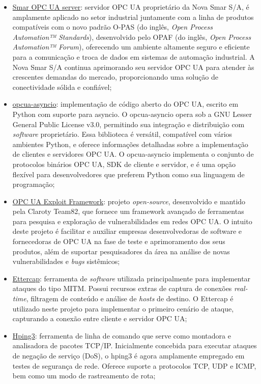     \begin{itemize}
        \item \underline{Smar OPC UA server}: servidor OPC UA proprietário da Nova Smar S/A, é amplamente aplicado no setor industrial juntamente com a linha de produtos compatíveis com o novo padrão O-PAS (do inglês, \textit{Open Process Automation™ Standards}), desenvolvido pelo OPAF (do inglês, \textit{Open Process Automation™ Forum}), oferecendo um ambiente altamente seguro e eficiente para a comunicação e troca de dados em sistemas de automação industrial. A Nova Smar S/A continua aprimorando seu servidor OPC UA para atender às crescentes demandas do mercado, proporcionando uma solução de conectividade sólida e confiável;
        \item \underline{opcua-asyncio}: implementação de código aberto do OPC UA, escrito em Python com suporte para asyncio. O opcua-asyncio opera sob a GNU Lesser General Public License v3.0,  permitindo sua integração e distribuição com \textit{software} proprietário. Essa biblioteca é versátil, compatível com vários ambientes Python, e oferece informações detalhadas sobre a implementação de clientes e servidores OPC UA. O opcua-asyncio implementa o conjunto de protocolos binários OPC UA, SDK de cliente e servidor, e é uma opção flexível para desenvolvedores que preferem Python como sua linguagem de programação;
        \item \underline{OPC UA Exploit Framework}: projeto \textit{open-source}, desenvolvido e mantido pela Claroty Team82, que fornece um framework avançado de ferramentas para pesquisa e exploração de vulnerabilidades em redes OPC UA. O intuito deste projeto é facilitar e auxiliar empresas desenvolvedoras de software e fornecedoras de OPC UA na fase de teste e aprimoramento dos seus produtos, além de suportar pesquisadores da área na análise de novas vulnerabilidades e \textit{bugs} sistêmicos;
        \item \underline{Ettercap}: ferramenta de \textit{software} utilizada principalmente para implementar ataques do tipo MITM. Possui recursos extras de captura de conexões \textit{real-time}, filtragem de conteúdo e análise de \textit{hosts} de destino. O Ettercap é utilizado neste projeto para implementar o primeiro cenário de ataque, capturando a conexão entre cliente e servidor OPC UA;
        \item \underline{Hping3}: ferramenta de linha de comando que serve como montadora e analisadora de pacotes TCP/IP. Inicialmente concebida para executar ataques de negação de serviço (DoS), o hping3 é agora amplamente empregado em testes de segurança de rede. Oferece suporte a protocolos TCP, UDP e ICMP, bem como um modo de rastreamento de rota;

\end{itemize}
